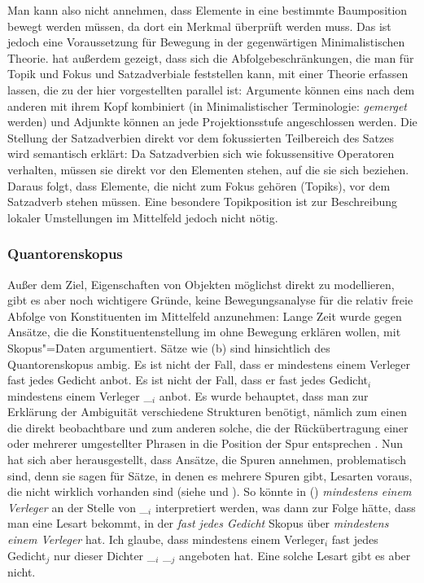 Man kann also nicht annehmen, dass Elemente in eine bestimmte Baumposition bewegt werden müssen,
da dort ein Merkmal überprüft werden muss. Das ist jedoch eine Voraussetzung für Bewegung in
der gegenwärtigen Minimalistischen Theorie. \textcites[Abschnitt~4]{Fanselow2003b}[]{Fanselow2006a} 
hat außerdem gezeigt, dass sich die Abfolgebeschränkungen,
die man für Topik und Fokus und Satzadverbiale
feststellen kann, mit einer Theorie erfassen lassen,
die zu der hier vorgestellten parallel ist: Argumente können eins nach dem anderen mit ihrem Kopf
kombiniert (in Minimalistischer Terminologie: \emph{gemerget} werden) und Adjunkte können an jede
Projektionsstufe angeschlossen werden. Die Stellung der Satzadverbien direkt vor dem fokussierten
Teilbereich des Satzes wird semantisch erklärt: Da Satzadverbien sich wie fokussensitive Operatoren
verhalten, müssen sie direkt vor den Elementen stehen, auf die sie sich beziehen. Daraus folgt,
dass Elemente, die nicht zum Fokus gehören (Topiks), vor dem Satzadverb stehen müssen. Eine besondere
Topikposition ist zur Beschreibung lokaler Umstellungen im Mittelfeld jedoch nicht nötig.
%

\subsubsection{Quantorenskopus}
\label{sec-Scrambling-Skopus}

Außer
dem Ziel, Eigenschaften von Objekten möglichst direkt zu modellieren, gibt es aber noch wichtigere
Gründe, keine Bewegungsanalyse für die relativ freie Abfolge von Konstituenten im Mittelfeld anzunehmen:
Lange Zeit wurde gegen Ansätze, die die Konstituentenstellung im \mf ohne Bewegung erklären wollen,
mit Skopus"=Daten argumentiert. Sätze wie (b) sind hinsichtlich des Quantorenskopus ambig.
\eal
\ex Es ist nicht der Fall, dass er mindestens einem Verleger fast jedes Gedicht anbot.
\ex Es ist nicht der Fall, dass er fast jedes Gedicht$_i$ mindestens einem Verleger \_$_i$ anbot.
\zl
Es wurde behauptet, dass man zur Erklärung der Ambiguität verschiedene Strukturen benötigt, nämlich
zum einen die direkt beobachtbare und zum anderen solche, die der Rückübertragung einer oder
mehrerer umgestellter Phrasen in die Position der Spur entsprechen \citep{Frey93a}.
Nun hat sich aber herausgestellt, dass Ansätze, die Spuren annehmen,
problematisch sind, denn sie sagen für Sätze, in denen es mehrere Spuren gibt, 
Lesarten voraus, die nicht wirklich vorhanden sind (siehe  und ).
So könnte \zb in () \emph{mindestens einem Verleger} an der Stelle von \_$_i$ interpretiert werden,
was dann zur Folge hätte, dass man eine Lesart bekommt, in der
\emph{fast jedes Gedicht} Skopus über \emph{mindestens einem Verleger} hat.
\ea
Ich glaube, dass mindestens einem Verleger$_i$ fast jedes Gedicht$_j$ nur dieser Dichter \_$_i$ \_$_j$ angeboten hat.
\z
Eine solche Lesart gibt es aber nicht.%
%


